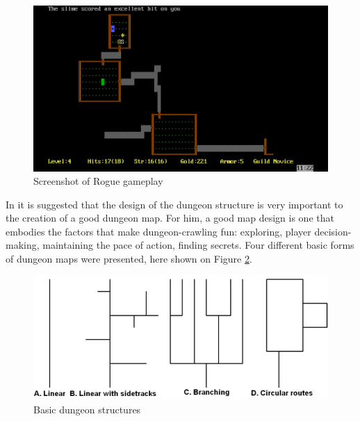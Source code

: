 \begin{figure}[h]
    \caption{Screenshot of Rogue gameplay}
    \centerline{\includegraphics[width=13cm]{images/introduction/rogue.jpg}}
    \label{fig:rogue}
\end{figure}

In \cite{melan:2006} it is suggested that the design of the dungeon structure is very important to the creation of a good dungeon map. For him, a good map design is one that embodies the factors that make dungeon-crawling fun: exploring, player decision-making, maintaining the pace of action, finding secrets. Four different basic forms of dungeon maps were presented, here shown on Figure \ref{fig:basic_dungeons}. 

\begin{figure}[h]
    \caption{Basic dungeon structures}
    \centerline{\includegraphics[width=13cm]{images/introduction/basic_dungeon.png}}
    \label{fig:basic_dungeons}
\end{figure}



